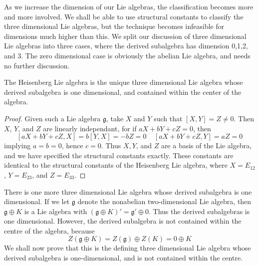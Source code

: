 As we increase the dimension of our Lie algebras, the classification becomes more and more involved. We shall be able to use structural constants to classify the three dimensional Lie algebras, but the technique becomes infeasible for dimensions much higher than this. We split our discussion of three dimensional Lie algebras into three cases, where the derived subalgebra has dimension 0,1,2, and 3. The zero dimensional case is obviously the abelian Lie algebra, and needs no further discussion.

\begin{theorem}
    The Heisenberg Lie algebra is the unique three dimensional Lie algebra whose derived subalgebra is one dimensional, and contained within the center of the algebra.
\end{theorem}
\begin{proof}
    Given such a Lie algebra $\mathfrak{g}$, take $X$ and $Y$ such that $[X,Y] = Z \neq 0$. Then $X$, $Y$, and $Z$ are linearly independant, for if $aX + bY + cZ = 0$, then
    \[ [aX + bY + cZ, X] = b[Y,X] = -bZ = 0\ \ \ \ \ [aX + bY + cZ, Y] = aZ = 0 \]
    implying $a = b = 0$, hence $c = 0$. Thus $X,Y$, and $Z$ are a basis of the Lie algebra, and we have specified the structural constants exactly. These constants are identical to the structural constants of the Heisenberg Lie algebra, where $X = E_{12}$, $Y = E_{23}$, and $Z = E_{33}$.
\end{proof}

There is one more three dimensional Lie algebra whose derived subalgebra is one dimensional. If we let $\mathfrak{g}$ denote the nonabelian two-dimensional Lie algebra, then $\mathfrak{g} \oplus K$ is a Lie algebra with $(\mathfrak{g} \oplus K)' = \mathfrak{g}' \oplus 0$. Thus the derived subalgebras is one dimensional. However, the derived subalgebra is not contained within the centre of the algebra, because
%
\[ Z(\mathfrak{g} \oplus K) = Z(\mathfrak{g}) \oplus Z(K) = 0 \oplus K \]
%
We shall now prove that this is the defining three dimensional Lie algebra whose derived subalgebra is one-dimensional, and is not contained within the centre.

